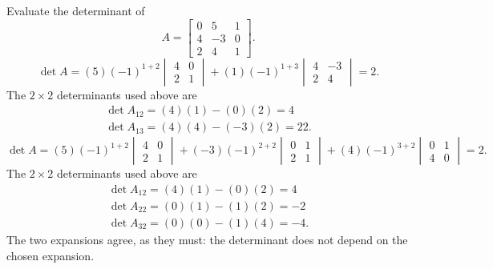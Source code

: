 \goal Evaluate the determinant of
\[A=\begin{bmatrix}0&5&1\\4&-3&0\\2&4&1\end{bmatrix}.\]
\[
\det A=(5)(-1)^{1+2}\begin{vmatrix}4&0\\2&1\end{vmatrix} + (1)(-1)^{1+3}\begin{vmatrix}4&-3\\2&4\end{vmatrix}=2.
\]
The $2\times2$ determinants used above are
\[
\begin{gathered}\det A_{12}=(4)(1)-(0)(2)=4\\\det A_{13}=(4)(4)-(-3)(2)=22.\end{gathered}
\]
\[
\det A=(5)(-1)^{1+2}\begin{vmatrix}4&0\\2&1\end{vmatrix} + (-3)(-1)^{2+2}\begin{vmatrix}0&1\\2&1\end{vmatrix} + (4)(-1)^{3+2}\begin{vmatrix}0&1\\4&0\end{vmatrix}=2.
\]
The $2\times2$ determinants used above are
\[
\begin{gathered}\det A_{12}=(4)(1)-(0)(2)=4\\\det A_{22}=(0)(1)-(1)(2)=-2\\\det A_{32}=(0)(0)-(1)(4)=-4.\end{gathered}
\]
The two expansions agree, as they must: the determinant does not depend on the chosen expansion.

